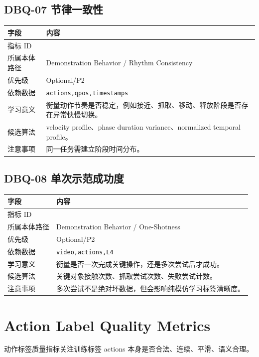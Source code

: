 \documentclass[UTF8,zihao=-4]{ctexart}
\newcommand{\Code}[1]{\texttt{#1}}
\newcommand{\MID}[1]{\texttt{\seqsplit{#1}}}
\begin{document}
\subsection{DBQ-07 节律一致性}

\begin{longtable}{L{3.6cm} L{9.6cm}}
\toprule
字段 & 内容 \\
\midrule
指标 ID & \MID{DBQ-07} \\
所属本体路径 & Demonstration Behavior / Rhythm Consistency \\
优先级 & Optional/P2 \\
依赖数据 & \Code{actions,qpos,timestamps} \\
学习意义 & 衡量动作节奏是否稳定，例如接近、抓取、移动、释放阶段是否存在异常快慢切换。 \\
候选算法 & velocity profile、phase duration variance、normalized temporal profile。 \\
注意事项 & 同一任务需建立阶段时间分布。 \\
\bottomrule
\end{longtable}

\subsection{DBQ-08 单次示范成功度}

\begin{longtable}{L{3.6cm} L{9.6cm}}
\toprule
字段 & 内容 \\
\midrule
指标 ID & \MID{DBQ-08} \\
所属本体路径 & Demonstration Behavior / One-Shotness \\
优先级 & Optional/P2 \\
依赖数据 & \Code{video,actions,L4} \\
学习意义 & 衡量是否一次完成关键操作，还是多次尝试后才成功。 \\
候选算法 & 关键对象接触次数、抓取尝试次数、失败尝试计数。 \\
注意事项 & 多次尝试不是绝对坏数据，但会影响纯模仿学习标签清晰度。 \\
\bottomrule
\end{longtable}

\section{Action Label Quality Metrics}

动作标签质量指标关注训练标签 actions 本身是否合法、连续、平滑、语义合理。
\end{document}
